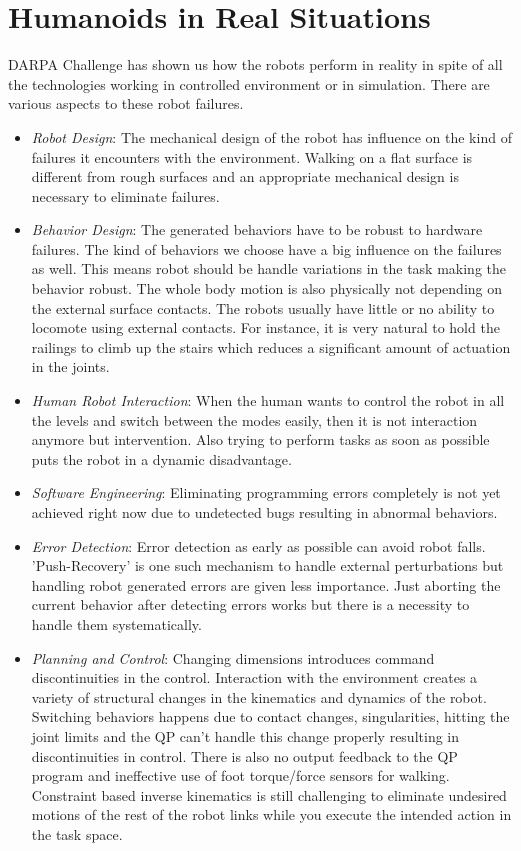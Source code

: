 \documentclass[a4paper,11pt,twoside]{StyleThese}
\begin{document}
\section{Humanoids in Real Situations}
DARPA Challenge has shown us how the robots perform in reality in spite of all the technologies working in controlled environment or in simulation. There are various aspects to these  robot failures.
\begin{itemize}
    \item \textit{Robot Design}: The mechanical design of the robot has influence on the kind of
    failures it encounters with the environment. Walking on a flat surface is different from rough surfaces and an appropriate mechanical design is necessary to eliminate failures.

    \item \textit{Behavior Design}: The generated behaviors have to be robust to hardware failures. The kind of behaviors we choose have a big influence on the failures as well. This means robot should be handle variations in the task making the behavior robust. The whole body motion is also physically not depending on the external surface contacts. The robots usually have little or no ability to locomote using external contacts. For instance, it is very natural to hold the railings to climb up the stairs which reduces a significant amount of actuation in the joints.
    \item \textit{Human Robot Interaction}: When the human wants to control the robot in all the levels and switch between the modes easily, then it is not interaction anymore but intervention. Also trying to perform tasks as soon as possible puts the robot in a dynamic disadvantage.       
    \item \textit{Software Engineering}: Eliminating programming errors completely is not yet achieved right now due to undetected bugs resulting in abnormal behaviors. 
    
    \item \textit{Error Detection}: Error detection as early as possible can avoid robot falls. 'Push-Recovery' is one such mechanism to handle external perturbations but handling robot generated errors are given less importance. Just aborting the current behavior after detecting errors works but there is a necessity to handle them systematically.  
    \item \textit{Planning and Control}: Changing dimensions introduces command discontinuities in the control. Interaction with the environment creates a variety of structural changes in the kinematics and dynamics of the robot. Switching behaviors happens due to contact changes, singularities, hitting the joint limits and the QP can't handle this change properly resulting in discontinuities in control. There is also no output feedback to the QP program and ineffective use of foot torque/force sensors for walking. Constraint based inverse kinematics is still challenging to eliminate undesired motions of the rest of the robot links while you execute the intended action in the task space.   
\end{itemize}
\end{document}
